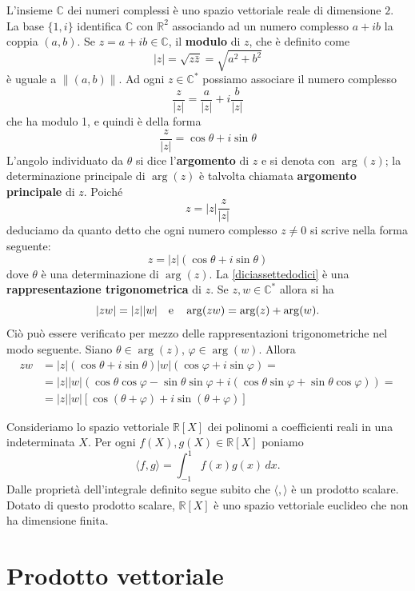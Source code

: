 \documentclass{article}
\theoremstyle{plain}
\theoremstyle{definition}
\theoremstyle{remark}
\begin{document}
L'insieme $\mathbb{C}$ dei numeri complessi è uno spazio vettoriale reale di dimensione $2$. La base $\{1, i\}$ 
identifica $\mathbb{C}$ con $\mathbb{R}^2$ associando ad un numero complesso $a + ib$ la coppia $(a, b)$. 
Se $z = a + ib \in \mathbb{C}$, il \textbf{modulo} di $z$, che è definito come
\[|z| = \sqrt{z\bar{z}} = \sqrt{a^2 + b^2}\]
è uguale a $\|(a, b)\|$. Ad ogni $z \in \mathbb{C}^*$ possiamo associare il numero complesso
\[\frac{z}{|z|} = \frac{a}{|z|} + i\frac{b}{|z|}\]
che ha modulo 1, e quindi è della forma
\[\frac{z}{|z|} = \cos\theta + i\sin\theta\]
L'angolo individuato da $\theta$ si dice l'\textbf{argomento} di $z$ e si denota con $\arg(z)$; 
la determinazione principale di $\arg(z)$ è talvolta chiamata \textbf{argomento principale} di $z$.
Poiché 
\[z = |z| \frac{z}{|z|}\]
deduciamo da quanto detto che ogni numero complesso $z \neq 0$ si scrive nella forma seguente:
\begin{equation}\label{diciassettedodici}
z = |z|(\cos\theta + i\sin\theta)
\end{equation}
dove $\theta$ è una determinazione di $\arg(z)$. La \ref{diciassettedodici} è una 
\textbf{rappresentazione trigonometrica} di $z$.
Se $z, w \in \mathbb{C}^*$ allora si ha 
\[|zw| = |z||w|\quad\textup{e}\quad\arg(zw) = \arg(z) + \arg(w).\]
Ciò può essere verificato per mezzo delle rappresentazioni trigonometriche nel modo seguente. 
Siano $\theta \in \arg(z)$, $\varphi \in \arg(w)$. Allora
\begin{align*}
zw &= |z|(\cos\theta + i\sin\theta)|w|(\cos\varphi + i\sin\varphi) = \\
&= |z||w|(\cos\theta\cos\varphi - \sin\theta\sin\varphi + i(\cos\theta\sin\varphi + \sin\theta\cos\varphi)) = \\
&= |z||w|[\cos(\theta + \varphi) + i\sin(\theta + \varphi)]
\end{align*}

\vspace{10pt}

Consideriamo lo spazio vettoriale $\mathbb{R}[X]$ dei polinomi a coefficienti reali in una indeterminata $X$. 
Per ogni $f(X), g(X) \in \mathbb{R}[X]$ poniamo
\[\langle f, g \rangle = \int_{-1}^{1} f(x)g(x) \,dx.\]
Dalle proprietà dell'integrale definito segue subito che $\langle , \rangle$ è un prodotto scalare. 
Dotato di questo prodotto scalare, $\mathbb{R}[X]$ è uno spazio vettoriale euclideo che non ha dimensione finita.

\vspace{50pt}
\section{Prodotto vettoriale}
\vspace{20pt}
\end{document}
